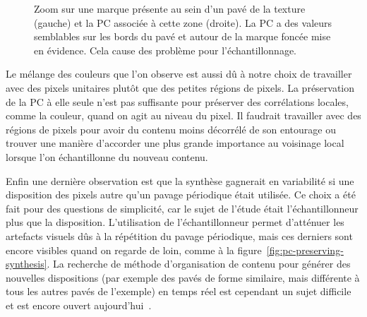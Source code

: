 \begin{figure}
\begin{subfigure}{.45\textwidth}
    \end{subfigure}

    \caption[Problème d'échantillonnage dû à la présence de marques au sein des pavés de la texture]{Zoom sur une marque présente au sein d'un pavé de la texture (gauche) et la PC associée à cette zone (droite). La PC a des valeurs semblables sur les bords du pavé et autour de la marque foncée mise en évidence. Cela cause des problème pour l'échantillonnage.}
    \label{fig:pc-defect}
\end{figure}

Le mélange des couleurs que l'on observe est aussi dû à notre choix de travailler avec des pixels unitaires plutôt que des petites régions de pixels. La préservation de la PC à elle seule n'est pas suffisante pour préserver des corrélations locales, comme la couleur, quand on agit au niveau du pixel. Il faudrait travailler avec des régions de pixels pour avoir du contenu moins décorrélé de son entourage ou trouver une manière d'accorder une plus grande importance au voisinage local lorsque l'on échantillonne du nouveau contenu.

\bigskip

Enfin une dernière observation est que la synthèse gagnerait en variabilité si une disposition des pixels autre qu'un pavage périodique était utilisée. Ce choix a été fait pour des questions de simplicité, car le sujet de l'étude était l'échantillonneur plus que la disposition. L'utilisation de l'échantillonneur permet d'atténuer les artefacts visuels dûs à la répétition du pavage périodique, mais ces derniers sont encore visibles quand on regarde de loin, comme à la figure~\ref{fig:pc-preserving-synthesis}. La recherche de méthode d'organisation de contenu pour générer des nouvelles dispositions (par exemple des pavés de forme similaire, mais différente à tous les autres pavés de l'exemple) en temps réel est cependant un sujet difficile et est encore ouvert aujourd'hui~\cite{guehl_semi-procedural_2020, baldi_differentiable_2023}.